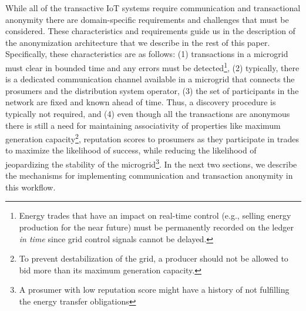 While all of the transactive IoT systems require communication and transactional anonymity there are domain-specific requirements and challenges that must be considered.  These characteristics and requirements guide us in the description of the anonymization architecture that we describe in the rest of this paper. Specifically, these characteristics are as follows: 
 (1) transactions in a microgrid must clear in bounded time and any errors must be detected\footnote{Energy trades that have an impact on real-time control (e.g., selling energy production for the near future) must be permanently recorded on the ledger \emph{in time} since grid control signals cannot be delayed.}, (2) typically, there is a dedicated communication channel available in a microgrid that connects the prosumers and the distribution system operator, (3) the set of participants in the network are fixed and known ahead of time. Thus, a discovery procedure is typically not required, and (4) even though all the transactions are anonymous there is still a need for maintaining associativity of properties like maximum generation capacity\footnote{To prevent destabilization of the grid, a producer should not be allowed to bid more than its maximum generation capacity.}, reputation scores to prosumers as they participate in trades to maximize the likelihood of success, while reducing the likelihood of jeopardizing the stability of the microgrid\footnote{A prosumer with low reputation score might have a history of not fulfilling the energy transfer obligations}. In the next two sections, we describe the mechanisms for implementing communication and transaction anonymity in this workflow.




